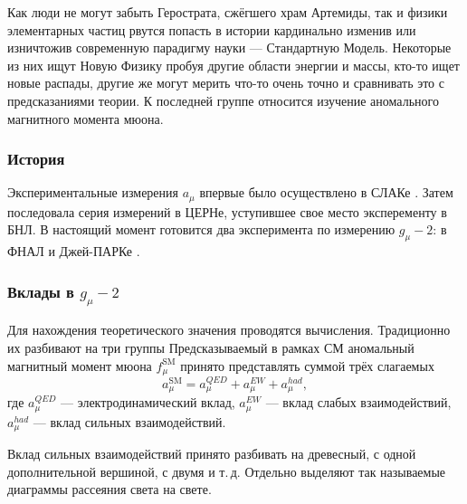 Как люди не могут забыть Герострата, сжёгшего храм Артемиды, так и физики
элементарных частиц рвутся попасть в истории кардинально изменив или
изничтожив современную парадигму науки --- Стандартную Модель. Некоторые
из них ищут Новую Физику пробуя другие области энергии и массы, кто-то
ищет новые распады, другие же могут мерить что-то очень точно и
сравнивать это с предсказаниями теории. К последней группе относится
изучение аномального магнитного момента мюона.

\subsubsection{История}\label{g-2-history}

Экспериментальные измерения $a_\mu$ впервые было осуществлено в СЛАКе \cite{Garwin:1960zz}.
Затем последовала серия измерений в ЦЕРНе, уступившее свое место эксперементу в БНЛ.
В настоящий момент готовится два эксперимента по измерению $g_\mu-2$: в ФНАЛ \cite{Grange:2015fou} и Джей-ПАРКе \cite{Saito:2012zz}.

\subsubsection{Вклады в \texorpdfstring{$g_\mu-2$}{muon g-2}}
\label{contribution-to-g-2}

Для нахождения теоретического значения проводятся вычисления.
Традиционно их разбивают на три группы
Предсказываемый в рамках СМ аномальный магнитный момент мюона $f_\mu^{\text{SM}}$ принято представлять суммой трёх слагаемых
\begin{equation}
    a_\mu^{\text{SM}} = a_\mu^{QED} + a_\mu^{EW} + a_\mu^{had},
\end{equation}
где $a_\mu^{QED}$ --- электродинамический вклад, $a_\mu^{EW}$ --- вклад
слабых взаимодействий, $a_\mu^{had}$ --- вклад сильных взаимодействий.

Вклад сильных взаимодействий принято разбивать на древесный, с одной
дополнительной вершиной, с двумя и т.\,д.
Отдельно выделяют так называемые
диаграммы рассеяния света на свете.

